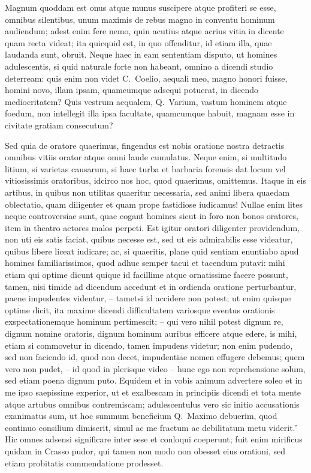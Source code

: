 Magnum quoddam est onus atque munus suscipere atque profiteri se esse, omnibus silentibus, unum maximis de rebus magno in conventu hominum audiendum; adest enim fere nemo, quin acutius atque acrius vitia in dicente quam recta videat; ita quicquid est, in quo offenditur, id etiam illa, quae laudanda sunt, obruit.  Neque haec in eam sententiam disputo, ut homines adulescentis, si quid naturale forte non habeant, omnino a dicendi studio deterream: quis enim non videt C.~Coelio, aequali meo, magno honori fuisse, homini novo, illam ipsam, quamcumque adsequi potuerat, in dicendo mediocritatem? Quis vestrum aequalem, Q.~Varium, vastum hominem atque foedum, non intellegit illa ipsa facultate, quamcumque habuit, magnam esse in civitate gratiam consecutum?

Sed quia de oratore quaerimus, fingendus est nobis oratione nostra detractis omnibus vitiis orator atque omni laude cumulatus. Neque enim, si multitudo litium, si varietas causarum, si haec turba et barbaria forensis dat locum vel vitiosissimis oratoribus, idcirco nos hoc, quod quaerimus, omittemus. Itaque in eis artibus, in quibus non utilitas quaeritur necessaria, sed animi libera quaedam oblectatio, quam diligenter et quam prope fastidiose iudicamus! Nullae enim lites neque controversiae sunt, quae cogant homines sicut in foro non bonos oratores, item in theatro actores malos perpeti. Est igitur oratori diligenter providendum, non uti eis satis faciat, quibus necesse est, sed ut eis admirabilis esse videatur, quibus libere liceat iudicare; ac, si quaeritis, plane quid sentiam enuntiabo apud homines familiarissimos, quod adhuc semper tacui et tacendum putavi: mihi etiam qui optime dicunt quique id facillime atque ornatissime facere possunt, tamen, nisi timide ad dicendum accedunt et in ordienda oratione perturbantur, paene impudentes videntur, – tametsi id accidere non potest; ut enim quisque optime dicit, ita maxime dicendi difficultatem variosque eventus orationis exspectationemque hominum pertimescit; – qui vero nihil potest dignum re, dignum nomine oratoris, dignum hominum auribus efficere atque edere, is mihi, etiam si commovetur in dicendo, tamen impudens videtur; non enim pudendo, sed non faciendo id, quod non decet, impudentiae nomen effugere debemus;  quem vero non pudet, – id quod in plerisque video – hunc ego non reprehensione solum, sed etiam poena dignum puto. Equidem et in vobis animum advertere soleo et in me ipso saepissime experior, ut et exalbescam in principiis dicendi et tota mente atque artubus omnibus contremiscam; adulescentulus vero sic initio accusationis exanimatus sum, ut hoc summum beneficium Q.~Maximo debuerim, quod continuo consilium dimiserit, simul ac me fractum ac debilitatum metu viderit.'' Hic omnes adsensi significare inter sese et conloqui coeperunt; fuit enim mirificus quidam in Crasso pudor, qui tamen non modo non obesset eius orationi, sed etiam probitatis commendatione prodesset.


